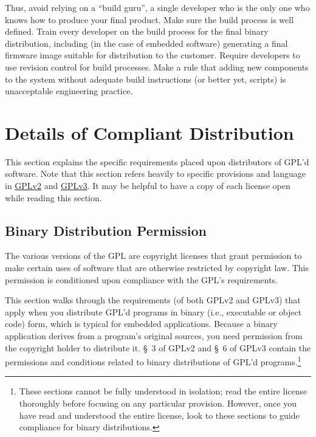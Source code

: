 Thus, avoid relying on a ``build guru'', a single developer who is the only one
who knows how to produce your final product. Make sure the build process
is well defined.  Train every developer on the build process for the final
binary distribution, including (in the case of embedded software)
generating a final firmware image suitable for distribution to the
customer.  Require developers to use revision control for build processes.
Make a rule that adding new components to the system without adequate
build instructions (or better yet, scripts) is unacceptable engineering
practice.

\chapter{Details of Compliant Distribution}

This section explains the specific requirements placed upon
distributors of GPL'd software.  Note that this section refers heavily to
specific provisions and language in
\href{http://www.gnu.org/licenses/old-licenses/gpl-2.0.html#section3}{GPLv2}
and \href{http://www.fsf.org/licensing/licenses/gpl.html#section6}{GPLv3}.
It may be helpful to have a copy of each license open while reading this
section.

\section{Binary Distribution Permission}
\label{binary-distribution-permission}


The various versions of the GPL are copyright licenses that grant
permission to make certain uses of software that are otherwise restricted
by copyright law.  This permission is conditioned upon compliance with the
GPL's requirements.

This section walks through the requirements (of both GPLv2 and GPLv3) that
apply when you distribute GPL'd programs in binary (i.e., executable or
object code) form, which is typical for embedded applications.  Because a
binary application derives from a program's original sources, you need
permission from the copyright holder to distribute it.  \S~3 of GPLv2 and
\S~6 of GPLv3 contain the permissions and conditions related to binary
distributions of GPL'd programs.\footnote{These sections cannot be fully
  understood in isolation; read the entire license thoroughly before
  focusing on any particular provision.  However, once you have read and
  understood the entire license, look to these sections to guide
  compliance for binary distributions.}

